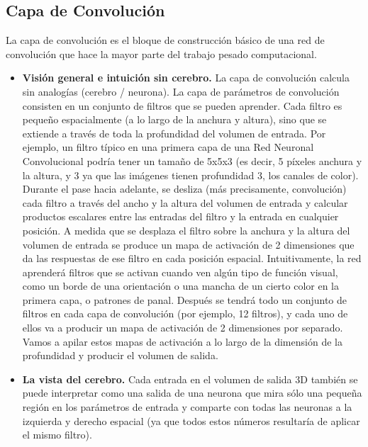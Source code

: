 \subsection{Capa de Convolución}
La capa de convolución es el bloque de construcción básico de una red de
convolución que hace la mayor parte del trabajo pesado computacional.
\begin{itemize}
\item \textbf{Visión general e intuición sin cerebro.} La capa de convolución calcula sin
analogías (cerebro / neurona). La capa de parámetros de convolución consisten en
un conjunto de filtros que se pueden aprender. Cada filtro es pequeño
espacialmente (a lo largo de la anchura y altura), sino que se extiende a través de
toda la profundidad del volumen de entrada. Por ejemplo, un filtro típico en una
primera capa de una Red Neuronal Convolucional podría tener un tamaño de
5x5x3 (es decir, 5 píxeles anchura y la altura, y 3 ya que las imágenes tienen
profundidad 3, los canales de color). Durante el pase hacia adelante, se desliza
(más precisamente, convolución) cada filtro a través del ancho y la altura del
volumen de entrada y calcular productos escalares entre las entradas del filtro y la
entrada en cualquier posición. A medida que se desplaza el filtro sobre la anchura
y la altura del volumen de entrada se produce un mapa de activación de 2
dimensiones que da las respuestas de ese filtro en cada posición
espacial. Intuitivamente, la red aprenderá filtros que se activan cuando ven algún
tipo de función visual, como un borde de una orientación o una mancha de un cierto color en la primera capa, o patrones de panal. Después se tendrá todo un
conjunto de filtros en cada capa de convolución (por ejemplo, 12 filtros), y cada
uno de ellos va a producir un mapa de activación de 2 dimensiones por
separado. Vamos a apilar estos mapas de activación a lo largo de la dimensión de
la profundidad y producir el volumen de salida.

\item \textbf{La vista del cerebro.} Cada entrada en el volumen de salida 3D también se puede
interpretar como una salida de una neurona que mira sólo una pequeña región en
los parámetros de entrada y comparte con todas las neuronas a la izquierda y
derecho espacial (ya que todos estos números resultaría de aplicar el mismo
filtro).


\end{itemize}
